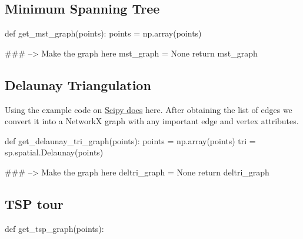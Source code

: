 \subsection{Minimum Spanning Tree}

\nwenddocs{}\plusendmoddef\nwstartdeflinemarkup{}\nwenddeflinemarkup

def get_mst_graph(points):
     points = np.array(points)

     ### --> Make the graph here
     mst_graph = None
     return mst_graph

\nwendcode{}\nwdocspar





\subsection{Delaunay Triangulation}

Using the example code on \href{https://docs.scipy.org/doc/scipy/reference/generated/scipy.spatial.Delaunay.html}{Scipy docs} here. 
After obtaining the list of edges we convert it into a NetworkX graph with any important edge and vertex attributes. 

\nwenddocs{}\plusendmoddef\nwstartdeflinemarkup{}\nwenddeflinemarkup
def get_delaunay_tri_graph(points):
     points = np.array(points)
     tri    = sp.spatial.Delaunay(points)

     ### --> Make the graph here
     deltri_graph = None
     return deltri_graph
\nwendcode{}\nwdocspar


\subsection{TSP tour}
\nwenddocs{}\plusendmoddef\nwstartdeflinemarkup{}\nwenddeflinemarkup
def get_tsp_graph(points):

